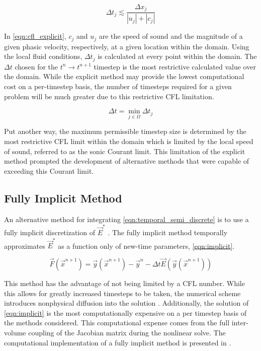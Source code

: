 \begin{equation}
\label{eqn:cfl_explicit}
\Delta t_j \lesssim \frac{\Delta x_j}{|u_j|+|c_j|}
\end{equation}

In \eqref{eqn:cfl_explicit}, $c_j$ and $u_j$ are the speed of sound and the magnitude of a given phasic velocity, respectively, at a given location within the domain.
Using the local fluid conditions, $\Delta t_j$ is calculated at every point within the domain.
The $\Delta t$ chosen for the $t^{n} \rightarrow t^{n+1}$ timestep is the most restrictive calculated value over the domain.
While the explicit method may provide the lowest computational cost on a per-timestep basis, the number of timesteps required for a given problem will be much greater due to this restrictive CFL limitation.

\begin{equation}
\label{eqn:global_cfl}
\Delta t = \min_{j \in \Omega} \Delta t_j
\end{equation}

Put another way, the maximum permissible timestep size is determined by the most restrictive CFL limit within the domain which is limited by the local speed of sound, referred to as the sonic Courant limit.
This limitation of the explicit method prompted the development of alternative methods that were capable of exceeding this Courant limit.

\subsection{Fully Implicit Method}
\label{subsect:numerics_fully_implicit}
An alternative method for integrating \eqref{eqn:temporal_semi_discrete} is to use a fully implicit discretization of $\vec{E}^{*}$ \cite{Frepoli2003, Barre1990}.
The fully implicit method temporally approximates $\vec{E}^{*}$ as a function only of new-time parameters, \eqref{eqn:implicit}.

\begin{equation}
\label{eqn:implicit}
\vec{F}(\vec{x}^{n+1}) = \vec{y}(\vec{x}^{n+1}) - \vec{y}^{n} - \Delta t \vec{E}(\vec{y}(\vec{x}^{n+1}))
\end{equation}

This method has the advantage of not being limited by a CFL number.
While this allows for greatly increased timesteps to be taken, the numerical scheme introduces nonphysical diffusion into the solution \cite{Mahaffy1993}.
Additionally, the solution of \eqref{eqn:implicit} is the most computationally expensive on a per timestep basis of the methods considered.
This computational expense comes from the full inter-volume coupling of the Jacobian matrix during the nonlinear solve.
The computational implementation of a fully implicit method is presented in .

